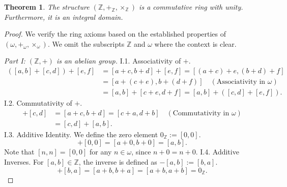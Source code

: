 \documentclass[11pt, a4paper]{article}
\theoremstyle{plain}
\newtheorem{theorem}{Theorem}[section]
\theoremstyle{definition}
\numberwithin{equation}{section}
\newcommand{\Z}{\mathbb{Z}}
\begin{document}
\begin{theorem}\label{thm:Z_is_ring}
The structure $(\Z, +_{\Z}, \times_{\Z})$ is a commutative ring with unity. Furthermore, it is an integral domain.
\end{theorem}
\begin{proof}
We verify the ring axioms based on the established properties of $(\omega, +_\omega, \times_\omega)$. We omit the subscripts $\Z$ and $\omega$ where the context is clear.

\emph{Part I: $(\Z, +)$ is an abelian group.}
I.1. Associativity of $+$.
\begin{align*}
    ([a, b] + [c, d]) + [e, f] &= [a+c, b+d] + [e, f] = [(a+c)+e, (b+d)+f] \\
    &= [a+(c+e), b+(d+f)] \quad (\text{Associativity in } \omega) \\
    &= [a, b] + [c+e, d+f] = [a, b] + ([c, d] + [e, f]).
\end{align*}
I.2. Commutativity of $+$.
\begin{align*}
    [a, b] + [c, d] &= [a+c, b+d] = [c+a, d+b] \quad (\text{Commutativity in } \omega) \\
    &= [c, d] + [a, b].
\end{align*}
I.3. Additive Identity. We define the zero element $0_{\Z} := [0, 0]$.
\begin{equation}
    [a, b] + [0, 0] = [a+0, b+0] = [a, b].
\end{equation}
Note that $[n, n] = [0, 0]$ for any $n \in \omega$, since $n+0 = n+0$.
I.4. Additive Inverses. For $[a, b] \in \Z$, the inverse is defined as $-[a, b] := [b, a]$.
\begin{equation}
    [a, b] + [b, a] = [a+b, b+a] = [a+b, a+b] = 0_{\Z}.
\end{equation}


\end{proof}
\end{document}
